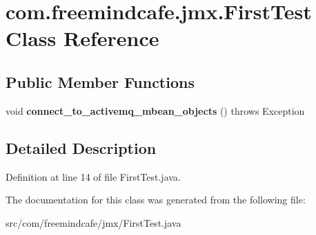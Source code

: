 \hypertarget{classcom_1_1freemindcafe_1_1jmx_1_1_first_test}{}\section{com.\+freemindcafe.\+jmx.\+First\+Test Class Reference}
\label{classcom_1_1freemindcafe_1_1jmx_1_1_first_test}
\subsection*{Public Member Functions}
\begin{DoxyCompactItemize}
\item 
\hypertarget{classcom_1_1freemindcafe_1_1jmx_1_1_first_test_a39d0aee208062b1ae558ce69b35cf6f3}{}void {\bfseries connect\+\_\+to\+\_\+activemq\+\_\+mbean\+\_\+objects} ()  throws Exception\label{classcom_1_1freemindcafe_1_1jmx_1_1_first_test_a39d0aee208062b1ae558ce69b35cf6f3}

\end{DoxyCompactItemize}


\subsection{Detailed Description}


Definition at line 14 of file First\+Test.\+java.



The documentation for this class was generated from the following file\+:\begin{DoxyCompactItemize}
\item 
src/com/freemindcafe/jmx/First\+Test.\+java\end{DoxyCompactItemize}
